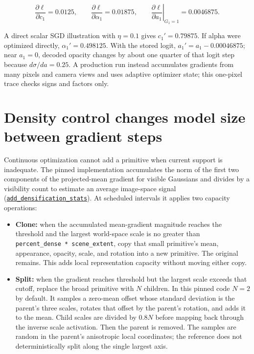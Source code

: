 \[
\frac{\partial\ell}{\partial c_1}=0.0125,\qquad
\frac{\partial\ell}{\partial\alpha_1}=0.01875,\qquad
\left.\frac{\partial\ell}{\partial a_1}\right|_{G_1=1}=0.0046875.
\]

A direct scalar SGD illustration with \(\eta=0.1\) gives \(c_1'=0.79875\). If alpha were optimized directly, \(\alpha_1'=0.498125\). With the stored logit, \(a_1'=a_1-0.00046875\); near \(a_1=0\), decoded opacity changes by about one quarter of that logit step because \(d\sigma/da=0.25\). A production run instead accumulates gradients from many pixels and camera views and uses adaptive optimizer state; this one-pixel trace checks signs and factors only.

\section{Density control changes model size between gradient steps}\label{04-visual-computing-ii-ch039-density-control-changes-model-size-between-gradient-steps}

\hypertarget{04-visual-computing-ii-ch039-density-control-changes-model-size-between-gradient-steps}{}

Continuous optimization cannot add a primitive when current support is inadequate. The pinned implementation accumulates the norm of the first two components of the projected-mean gradient for visible Gaussians and divides by a visibility count to estimate an average image-space signal (\href{https://github.com/graphdeco-inria/gaussian-splatting/blob/54c035f7834b564019656c3e3fcc3646292f727d/scene/gaussian_model.py\#L471-L472}{\texttt{add\_densification\_stats}}). At scheduled intervals it applies two capacity operations:

\begin{itemize}
\tightlist
\item
  \textbf{Clone:} when the accumulated mean-gradient magnitude reaches the threshold and the largest world-space scale is no greater than \texttt{percent\_dense\ *\ scene\_extent}, copy that small primitive's mean, appearance, opacity, scale, and rotation into a new primitive. The original remains. This adds local representation capacity without moving either copy.
\item
  \textbf{Split:} when the gradient reaches threshold but the largest scale exceeds that cutoff, replace the broad primitive with \(N\) children. In this pinned code \(N=2\) by default. It samples a zero-mean offset whose standard deviation is the parent's three scales, rotates that offset by the parent's rotation, and adds it to the mean. Child scales are divided by \(0.8N\) before mapping back through the inverse scale activation. Then the parent is removed. The samples are random in the parent's anisotropic local coordinates; the reference does not deterministically split along the single largest axis.
\end{itemize}

